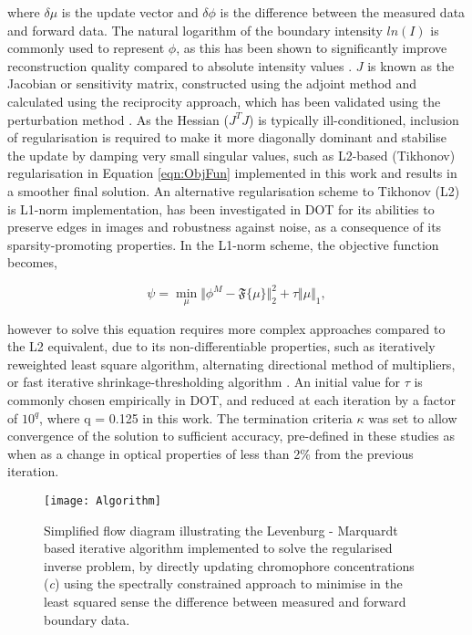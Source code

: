 \documentclass[twoside]{bhamthesis}
\theoremstyle{definition}
\begin{document}
where $\delta \mu$ is the update vector and $\delta \phi$ is the difference between the measured data and forward data. The natural logarithm of the boundary intensity $ln(I)$ is commonly used to represent $\phi$, as this has been shown to significantly improve reconstruction quality compared to absolute intensity values \cite{arridge1999optical}.  $J$ is known as the Jacobian or sensitivity matrix, constructed using the adjoint method and calculated using the reciprocity approach, which has been validated using the perturbation method \cite{arridge1995photon}. As the Hessian ($J^T J$) is typically ill-conditioned, inclusion of regularisation is required to make it more diagonally dominant and stabilise the update by damping very small singular values, such as L2-based (Tikhonov) regularisation \cite{tikhonov2013numerical} in Equation \ref{eqn:ObjFun} implemented in this work and results in a smoother final solution. An alternative regularisation scheme to Tikhonov (L2) is L1-norm implementation,  has been investigated in DOT for its abilities to preserve edges in images and robustness against noise, as a consequence of its sparsity-promoting properties. In the L1-norm scheme, the objective function becomes,

\begin{equation} 
 \psi = \min_{\mu} \Vert \phi^M - \mathfrak{F} \lbrace \mu \rbrace \Vert^2_2 + \tau \Vert \mu \Vert_1,
  \label{eqn:RTE}
\end{equation}

however to solve this equation requires more complex approaches compared to the L2 equivalent, due to its non-differentiable properties, such as iteratively reweighted least square algorithm, alternating directional method of multipliers, or fast iterative shrinkage-thresholding algorithm \cite{lu20181}.  An initial value for $\tau$ is commonly chosen empirically in DOT, and reduced at each iteration by a factor of $10^{q}$, where q = 0.125 in this work. The termination criteria $\kappa$ was set to allow convergence of the solution to sufficient accuracy, pre-defined in these studies as when as a change in optical properties of less than 2\% from the previous iteration.

\begin{figure}[!ht]
  \centering
  \texttt{[image: Algorithm]}
\caption{Simplified flow diagram illustrating the Levenburg - Marquardt based iterative algorithm implemented to solve the regularised inverse problem, by directly updating chromophore concentrations (\textit{c}) using the spectrally constrained approach to minimise in the least squared sense the difference between measured and forward boundary data.}
\label{fig:Inverse_algorithm}
\end{figure}
\end{document}
